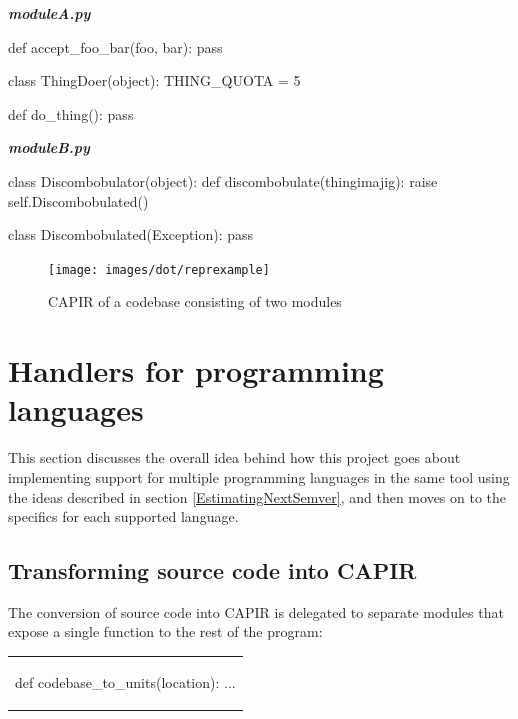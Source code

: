 \documentclass{l4proj}
\newenvironment{halfmini}[1]
{
\begin{minipage}[t]{0.5\textwidth}
\noindent\textbf{\textit{#1}}\\
}
{
\end{minipage}
}
\begin{document}
\vspace{2\baselineskip}
\begin{halfmini}{moduleA.py}
\begin{python}
def accept_foo_bar(foo, bar):
    pass

class ThingDoer(object):
    THING_QUOTA = 5

    def do_thing():
        pass
\end{python}
\end{halfmini}
\begin{halfmini}{moduleB.py}
\begin{python}
class Discombobulator(object):
    def discombobulate(thingimajig):
        raise self.Discombobulated()

    class Discombobulated(Exception):
        pass
\end{python}
\end{halfmini}
\vspace{\fill}
\begin{figure}[H]
\centering
\texttt{[image: images/dot/reprexample]}
\caption{CAPIR of a codebase consisting of two modules}
\label{RepresentationExample}
\end{figure}
\clearpage

\section{Handlers for programming languages}
\label{LanguageHandlers}

This section discusses the overall idea behind how this project goes
about implementing support for multiple programming languages in the
same tool using the ideas described in section
\ref{EstimatingNextSemver}, and then moves on to the specifics for
each supported language.

\subsection{Transforming source code into CAPIR}

The conversion of source code into CAPIR is delegated to separate
modules that expose a single function to the rest of the program:

\begin{center}
\begin{tabular}{c}
\begin{python}
def codebase_to_units(location):
    ...
\end{python}
\end{tabular}
\end{center}
\end{document}

